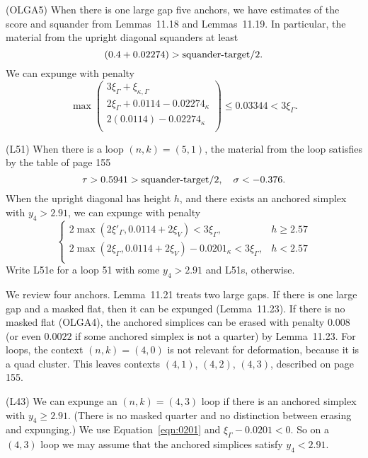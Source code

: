 \documentclass[11pt]{amsart}
\def\op#1{{\text{#1}}}
\def\text{\hbox}
\begin{document}
(OLGA5) When there is one large gap five anchors, we have estimates of the score and squander
from Lemmas~11.18 and Lemmas~11.19.  In particular, the material from the upright diagonal squanders at least 
  $$(0.4 + 0.02274) > \op{squander-target}/2.$$  We can expunge with penalty
  $$\max \left(\begin{array}{lll}
  3\xi_\Gamma + \xi_{\kappa,\Gamma}\\
  2\xi_\Gamma + 0.0114 - 0.02274_\kappa\\
  2 (0.0114) - 0.02274_\kappa\\
  \end{array}
   \right)\le 0.03344 < 3\xi_\Gamma.$$
  
(L51) When there is a loop $(n,k)=(5,1)$, 
the material from the loop satisfies by the table
of page 155
  $$
  \tau > 0.5941 > \op{squander-target}/2,\quad \sigma < -0.376.
  $$
When the upright diagonal has height $h$, and there exists an anchored simplex
with $y_4 > 2.91$, we can expunge with penalty
  $$
  \begin{cases}
  2 \max(2\xi'_\Gamma,0.0114+2\xi_V) < 3\xi_\Gamma, & h \ge 2.57\\
  2 \max(2\xi_\Gamma,0.0114+2\xi_V) - 0.0201_\kappa < 3 \xi_\Gamma, & h < 2.57\\
  \end{cases}
  $$
Write L51e for a loop 51 with some $y_4 > 2.91$ and L51s, otherwise.

We review four anchors.
Lemma~11.21 treats two large gaps.  If there is one large gap and a masked flat, then it can be expunged (Lemma~11.23).  If there
is no masked flat (OLGA4), 
the anchored simplices can be erased with penalty $0.008$ (or even $0.0022$ if some anchored simplex is not a quarter) by Lemma~11.23.  For loops, the context $(n,k)=(4,0)$
is not relevant for deformation, because it is a quad cluster.  This leaves contexts $(4,1)$, $(4,2)$, $(4,3)$, described on page 155. 

(L43) We can expunge an $(n,k)=(4,3)$ loop if there is an anchored simplex with $y_4\ge 2.91$.  (There is no masked quarter and no distinction between erasing and expunging.)  We use Equation~\ref{eqn:0201} and $\xi_\Gamma - 0.0201 < 0$.  So on a $(4,3)$ loop we may assume that the anchored simplices satisfy $y_4 < 2.91$.
\end{document}

